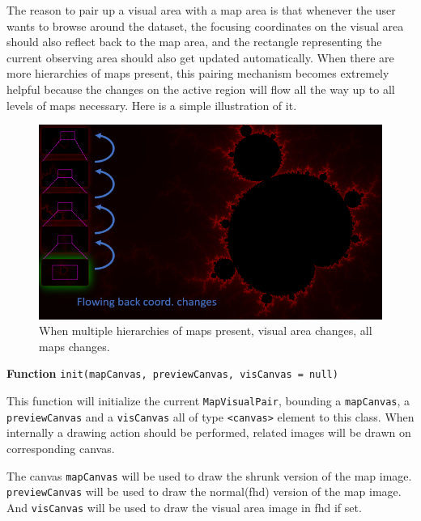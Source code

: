 The reason to pair up a visual area with a \gls{map} area is that whenever the user wants to browse around the dataset, the focusing coordinates on the visual area should also reflect back to the \gls{map} area, and the rectangle representing the current observing area should also get updated automatically. When there are more hierarchies of \glspl{map} present, this pairing mechanism becomes extremely helpful because the changes on the active region will flow all the way up to all levels of \glspl{map} necessary. Here  is a simple illustration of it.

\begin{figure}[th]
\centering
\includegraphics[width=\textwidth,keepaspectratio]{Figures/Chapter4/mvp-pairflow.png}
\decoRule
\caption[Pairing Multiple Levels of \glspl{map}]{When multiple hierarchies of \glspl{map} present, visual area changes, all \glspl{map} changes.}
\label{fig:mvp-pairflow}
\end{figure}

\textbf{Function} \verb|init(mapCanvas, previewCanvas, visCanvas = null)|

This function will initialize the current \texttt{MapVisualPair}, bounding a \texttt{mapCanvas}, a \texttt{previewCanvas} and a \texttt{visCanvas} all of type \texttt{<canvas>} element to this class. When internally a drawing action should be performed, related images will be drawn on corresponding canvas.

The canvas \texttt{mapCanvas} will be used to draw the shrunk version of the \gls{map} image. \texttt{previewCanvas} will be used to draw the normal(\gls{fhd}) version of the \gls{map} image. And \texttt{visCanvas} will be used to draw the visual area image in \gls{fhd} if set.

